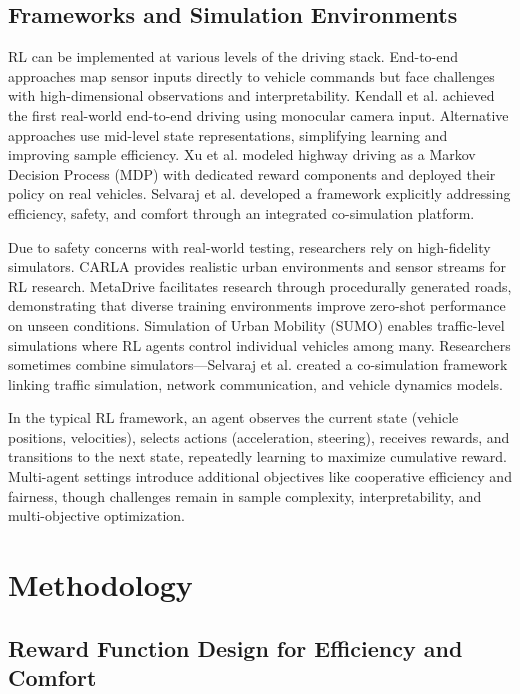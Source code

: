 \documentclass[12pt,a4paper]{article}
\begin{document}
\subsection{Frameworks and Simulation Environments}
RL can be implemented at various levels of the driving stack. End-to-end approaches map sensor inputs directly to vehicle commands but face challenges with high-dimensional observations and interpretability\cite{survey2023}. Kendall et al.\cite{kendall2019} achieved the first real-world end-to-end driving using monocular camera input. Alternative approaches use mid-level state representations, simplifying learning and improving sample efficiency\cite{survey2023}. Xu et al.\cite{xu2018} modeled highway driving as a Markov Decision Process (MDP) with dedicated reward components and deployed their policy on real vehicles. Selvaraj et al.\cite{selvaraj2023} developed a framework explicitly addressing efficiency, safety, and comfort through an integrated co-simulation platform.

Due to safety concerns with real-world testing, researchers rely on high-fidelity simulators. CARLA\cite{pmlr-v78-dosovitskiy17a} provides realistic urban environments and sensor streams for RL research. MetaDrive\cite{metadrive} facilitates research through procedurally generated roads, demonstrating that diverse training environments improve zero-shot performance on unseen conditions. Simulation of Urban Mobility (SUMO)\cite{lopez2018} enables traffic-level simulations where RL agents control individual vehicles among many. Researchers sometimes combine simulators—Selvaraj et al.\cite{selvaraj2023} created a co-simulation framework linking traffic simulation, network communication, and vehicle dynamics models.

In the typical RL framework, an agent observes the current state (vehicle positions, velocities), selects actions (acceleration, steering), receives rewards, and transitions to the next state, repeatedly learning to maximize cumulative reward. Multi-agent settings introduce additional objectives like cooperative efficiency and fairness, though challenges remain in sample complexity, interpretability, and multi-objective optimization\cite{survey2023,kiran2022}.

\section{Methodology}
\subsection{Reward Function Design for Efficiency and Comfort}\label{sec:reward_design}
\end{document}
